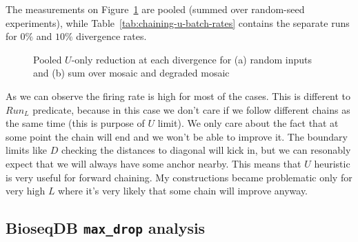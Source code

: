 The measurements on Figure~\ref{fig:chaining-u-batch-reduction} are pooled (summed over random-seed experiments), while Table~\ref{tab:chaining-u-batch-rates} contains the separate runs for $0\%$ and $10\%$ divergence rates.

\begin{figure}[H]
\centering

\caption{Pooled \(U\)-only reduction at each divergence for (a) random inputs and (b) sum over mosaic and degraded mosaic}
\label{fig:chaining-u-batch-reduction}
\end{figure}

\begin{table}[H]
\centering
\caption{\(\operatorname{NoUpdate}_L/\operatorname{Reduction}^{U}_L\) (percent).
Random uses \(N=4000\), a 4.5-Mbase
target, 997--1002-base queries, and the same divergence levels as presented previously. Spaced copy uses \(R\in\{1,2,4,8,16,32,64\}\). The Minimizer-island comb uses
\(m\in\{1,2,4,\ldots,1024\}\).  Defaults are \(k=15\), \(w=10\), \(S=25\), and
\texttt{max\_chain\_iter}=5000.}
\label{tab:chaining-u-batch-rates}
\scriptsize
\setlength{\tabcolsep}{2.5pt}
\renewcommand{\arraystretch}{1.0}
\end{table}
\endgroup

As we can observe the firing rate is high for most of the cases. This is different to $Run_L$ predicate, because in this case we don't care if we follow different chains as the same time (this is purpose of $U$ limit). We only care about the fact that
at some point the chain will end and we won't be able to improve it. The boundary limits like $D$ checking the distances to diagonal will kick in, but we can resonably expect that we will always have some anchor nearby. 
This means that $U$ heuristic is very useful for forward chaining. My constructions became problematic only for very high $L$ where it's very likely that some chain will improve anyway. 


\subsection{BioseqDB \texttt{max\_drop} analysis}
\label{sec:chaining-max-drop-analysis}

